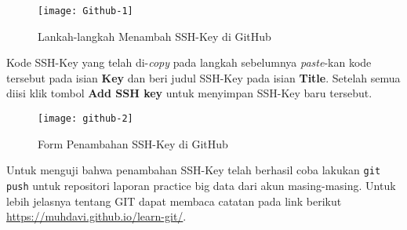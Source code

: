 \documentclass[a4paper]{tufte-handout}
\begin{document}
\begin{enumerate}
\begin{figure}[!ht]
\centering
\texttt{[image: Github-1]}
\caption{Lankah-langkah Menambah SSH-Key di GitHub}
\label{gam:langkah-ssh}
\end{figure}

Kode SSH-Key yang telah di-\textit{copy} pada langkah sebelumnya \textit{paste}-kan kode tersebut pada isian \textbf{Key} dan beri judul SSH-Key pada isian \textbf{Title}. Setelah semua diisi klik tombol \textbf{Add SSH key} untuk menyimpan SSH-Key baru tersebut.

\begin{figure}[!ht]
\centering
\texttt{[image: github-2]}
\caption{Form Penambahan SSH-Key di GitHub}
\label{gam:tambah-ssh}
\end{figure}

Untuk menguji bahwa penambahan SSH-Key telah berhasil coba lakukan {\tt git push} untuk repositori laporan practice big data dari akun masing-masing. Untuk lebih jelasnya tentang GIT dapat membaca catatan pada link berikut \url{https://muhdavi.github.io/learn-git/}.
\end{enumerate}
\end{document}
